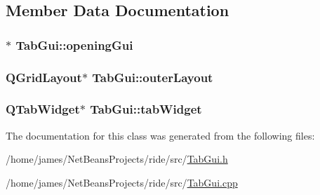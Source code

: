 \subsection{Member Data Documentation}
\hypertarget{class_tab_gui_a2df2168c961cdd5cd29b96de3358f90b}{
\subsubsection[{opening\-Gui}]{$\ast$ Tab\-Gui\-::opening\-Gui\hspace{0.3cm}{\ttfamily [private]}}}\label{class_tab_gui_a2df2168c961cdd5cd29b96de3358f90b}
\hypertarget{class_tab_gui_a6d33a663f8871b856495286a691a88f8}{
\subsubsection[{outer\-Layout}]{\setlength{\rightskip}{0pt plus 5cm}Q\-Grid\-Layout$\ast$ Tab\-Gui\-::outer\-Layout\hspace{0.3cm}{\ttfamily [private]}}}\label{class_tab_gui_a6d33a663f8871b856495286a691a88f8}
\hypertarget{class_tab_gui_ab036ccdd9eba80231890f11bff7557cc}{
\subsubsection[{tab\-Widget}]{\setlength{\rightskip}{0pt plus 5cm}Q\-Tab\-Widget$\ast$ Tab\-Gui\-::tab\-Widget\hspace{0.3cm}{\ttfamily [private]}}}\label{class_tab_gui_ab036ccdd9eba80231890f11bff7557cc}


The documentation for this class was generated from the following files\-:\begin{DoxyCompactItemize}
\item 
/home/james/\-Net\-Beans\-Projects/ride/src/\hyperlink{_tab_gui_8h}{Tab\-Gui.\-h}\item 
/home/james/\-Net\-Beans\-Projects/ride/src/\hyperlink{_tab_gui_8cpp}{Tab\-Gui.\-cpp}\end{DoxyCompactItemize}

